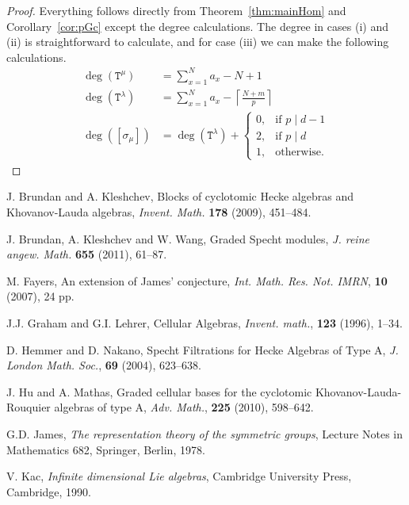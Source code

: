 \documentclass[twoside,11pt,reqno,letter]{amsart}
\numberwithin{equation}{section}
\theoremstyle{definition}  %
\newcommand{\0}{{\bar 0}}
\newcommand{\1}{{\bar 1}}
\newcommand{\la}{\lambda}
\newcommand{\si}{\sigma}
\def\T{{\mathtt T}}
\begin{document}
{\begin{proof}
Everything follows directly from Theorem~\ref{thm:mainHom} and Corollary~\ref{cor:pGc} except the degree calculations. The degree in cases (i) and (ii) is straightforward to calculate, and for case (iii) we can make the following calculations. 
\begin{align*}
\deg(\T^\mu) &= \sum_{x=1}^N a_x - N + 1 \\
\deg(\T^\la) &= \sum_{x=1}^N a_x - \left\lceil \frac{N+m}{p} \right\rceil \\
\deg([\si_\mu]) &= \deg(\T^\la) + \begin{cases} 0, &\text{if } p \mid d-1\\
        2, &\text{if } p \mid d\\
        1, &\text{otherwise.} \end{cases}
\end{align*}
\end{proof}











\begin{thebibliography}{ABC}

J. Brundan and A. Kleshchev,
Blocks of cyclotomic Hecke algebras and Khovanov-Lauda algebras, 
{\em Invent. Math.} {\bf 178} (2009), 451--484.

J. Brundan, A. Kleshchev and W. Wang,
Graded Specht modules,
 {\em J. reine angew. Math.} {\bf 655} (2011), 61--87.

M. Fayers, 
An extension of James' conjecture,
 {\em Int. Math. Res. Not. IMRN}, {\bf 10} (2007), 24 pp.

J.J. Graham and G.I. Lehrer, Cellular Algebras,
 {\em Invent. math.}, {\bf 123} (1996), 1--34.

D. Hemmer and D. Nakano, 
Specht Filtrations for Hecke Algebras of Type A,
 {\em J. London Math. Soc.}, {\bf 69} (2004), 623--638.

J. Hu and A. Mathas, Graded cellular bases for the cyclotomic Khovanov-Lauda-Rouquier algebras of
type A, {\em Adv. Math.}, {\bf 225} (2010), 598--642.

G.D. James, {\em The representation theory of the symmetric groups},
 Lecture Notes in Mathematics 682, Springer, Berlin, 1978.

V. Kac, {\em Infinite dimensional Lie algebras},
 Cambridge University Press, Cambridge, 1990.


\end{thebibliography}}
\end{document}
